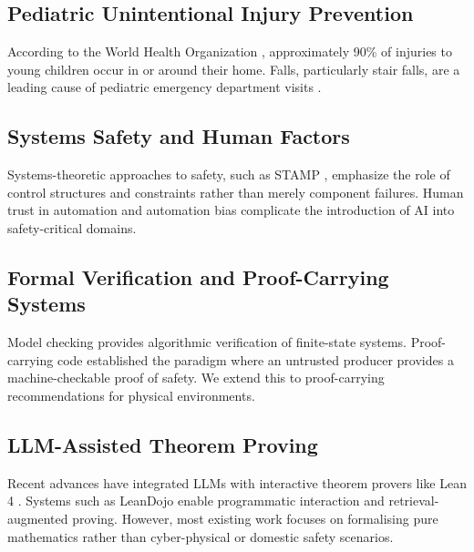 \subsection{Pediatric Unintentional Injury Prevention}
According to the World Health Organization \cite{who2008world}, approximately 90\% of injuries to young children occur in or around their home. Falls, particularly stair falls, are a leading cause of pediatric emergency department visits \cite{ali2019consumer}.

\subsection{Systems Safety and Human Factors}
Systems-theoretic approaches to safety, such as STAMP \cite{leveson2011engineering}, emphasize the role of control structures and constraints rather than merely component failures. Human trust in automation \cite{lee2004trust} and automation bias \cite{parasuraman1997humans} complicate the introduction of AI into safety-critical domains.

\subsection{Formal Verification and Proof-Carrying Systems}
Model checking \cite{baier2008principles} provides algorithmic verification of finite-state systems. Proof-carrying code \cite{necula1997proof} established the paradigm where an untrusted producer provides a machine-checkable proof of safety. We extend this to proof-carrying recommendations for physical environments.

\subsection{LLM-Assisted Theorem Proving}
Recent advances have integrated LLMs with interactive theorem provers like Lean 4 \cite{moura2021lean}. Systems such as LeanDojo \cite{yang2023leandojo} enable programmatic interaction and retrieval-augmented proving. However, most existing work focuses on formalising pure mathematics rather than cyber-physical or domestic safety scenarios.
